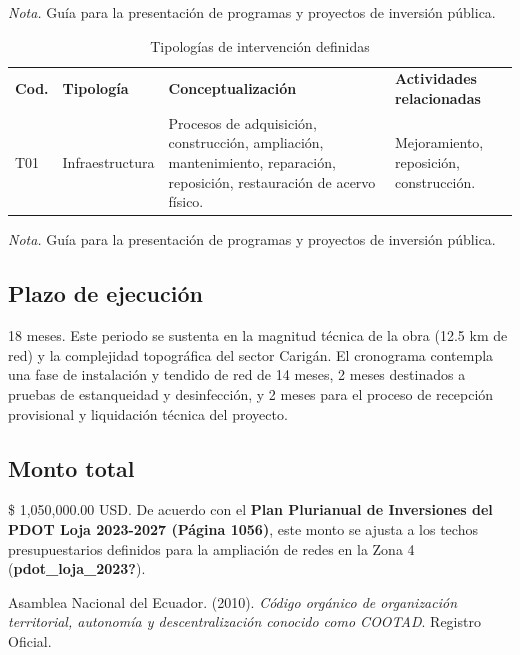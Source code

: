\documentclass[12pt,spanish]{article}
\newlength{\cslhangindent}
\newlength{\csllabelwidth}
\newcommand{\citeproctext}{}
\newenvironment{CSLReferences}[2] 
 {\begin{list}{}{
  \setlength{\leftmargin}{\cslhangindent}
  \setlength{\parsep}{0pt}
  \setlength{\itemsep}{6pt}
  \ifodd #1
   \setlength{\leftmargin}{\leftmargin + \csllabelwidth}
   \setlength{\itemindent}{-\csllabelwidth}
  \fi
  }
  \renewcommand{\bibitem}[2][]{\item} %
 }
 {\end{list}}
\newcommand{\fuente}[1]{
  \vspace{4pt}
  \begin{flushleft}
    \small
    \textit{Nota.} #1
  \end{flushleft}
}
\begin{document}
\fuente{Guía para la presentación de programas y proyectos de inversión pública.}

\begin{longtable}{llp{5cm}p{4cm}}

\caption{\label{tbl-tipologias}Tipologías de intervención definidas}

\tabularnewline

  \\
\toprule
\textbf{Cod.} & \textbf{Tipología} & \textbf{Conceptualización} & \textbf{Actividades relacionadas} \\
\midrule
T01 & Infraestructura & Procesos de adquisición, construcción, ampliación, mantenimiento, reparación, reposición, restauración de acervo físico. & Mejoramiento, reposición, construcción. \\
\bottomrule

\end{longtable}

\fuente{Guía para la presentación de programas y proyectos de inversión pública.}

\subsection{Plazo de ejecución}\label{plazo-de-ejecuciuxf3n}

18 meses. Este periodo se sustenta en la magnitud técnica de la obra
(12.5 km de red) y la complejidad topográfica del sector Carigán. El
cronograma contempla una fase de instalación y tendido de red de 14
meses, 2 meses destinados a pruebas de estanqueidad y desinfección, y 2
meses para el proceso de recepción provisional y liquidación técnica del
proyecto.

\subsection{Monto total}\label{monto-total}

\$ 1,050,000.00 USD. De acuerdo con el \textbf{Plan Plurianual de
Inversiones del PDOT Loja 2023-2027 (Página 1056)}, este monto se ajusta
a los techos presupuestarios definidos para la ampliación de redes en la
Zona 4 (\textbf{pdot\_loja\_2023?}).

\protect{}\label{refs}
\begin{CSLReferences}{1}{0}
\bibitem[\citeproctext]{ref-cootad2010}
Asamblea Nacional del Ecuador. (2010). \emph{Código orgánico de
organización territorial, autonomía y descentralización conocido como
COOTAD}. Registro Oficial.

\end{CSLReferences}
\end{document}
